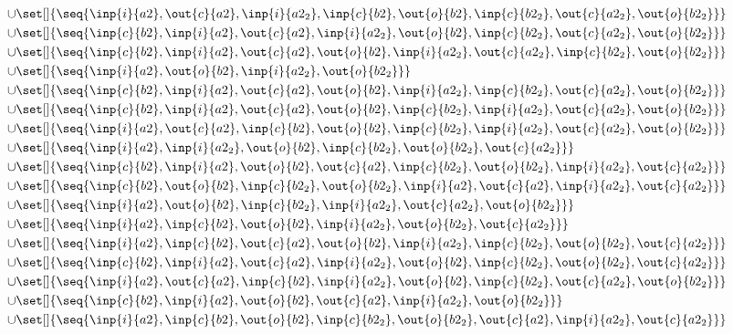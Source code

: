 \begin{align*}
\cup&\set[]{\seq{\inp{i}{a2},\out{c}{a2},\inp{i}{a2_2},\inp{c}{b2},\out{o}{b2},\inp{c}{b2_2},\out{c}{a2_2},\out{o}{b2_2}}}\\
\cup&\set[]{\seq{\inp{c}{b2},\inp{i}{a2},\out{c}{a2},\inp{i}{a2_2},\out{o}{b2},\inp{c}{b2_2},\out{c}{a2_2},\out{o}{b2_2}}}\\
\cup&\set[]{\seq{\inp{c}{b2},\inp{i}{a2},\out{c}{a2},\out{o}{b2},\inp{i}{a2_2},\out{c}{a2_2},\inp{c}{b2_2},\out{o}{b2_2}}}\\
\cup&\set[]{\seq{\inp{i}{a2},\out{o}{b2},\inp{i}{a2_2},\out{o}{b2_2}}}\\
\cup&\set[]{\seq{\inp{c}{b2},\inp{i}{a2},\out{c}{a2},\out{o}{b2},\inp{i}{a2_2},\inp{c}{b2_2},\out{c}{a2_2},\out{o}{b2_2}}}\\
\cup&\set[]{\seq{\inp{c}{b2},\inp{i}{a2},\out{c}{a2},\out{o}{b2},\inp{c}{b2_2},\inp{i}{a2_2},\out{c}{a2_2},\out{o}{b2_2}}}\\
\cup&\set[]{\seq{\inp{i}{a2},\out{c}{a2},\inp{c}{b2},\out{o}{b2},\inp{c}{b2_2},\inp{i}{a2_2},\out{c}{a2_2},\out{o}{b2_2}}}\\
\cup&\set[]{\seq{\inp{i}{a2},\inp{i}{a2_2},\out{o}{b2},\inp{c}{b2_2},\out{o}{b2_2},\out{c}{a2_2}}}\\
\cup&\set[]{\seq{\inp{c}{b2},\inp{i}{a2},\out{o}{b2},\out{c}{a2},\inp{c}{b2_2},\out{o}{b2_2},\inp{i}{a2_2},\out{c}{a2_2}}}\\
\cup&\set[]{\seq{\inp{c}{b2},\out{o}{b2},\inp{c}{b2_2},\out{o}{b2_2},\inp{i}{a2},\out{c}{a2},\inp{i}{a2_2},\out{c}{a2_2}}}\\
\cup&\set[]{\seq{\inp{i}{a2},\out{o}{b2},\inp{c}{b2_2},\inp{i}{a2_2},\out{c}{a2_2},\out{o}{b2_2}}}\\
\cup&\set[]{\seq{\inp{i}{a2},\inp{c}{b2},\out{o}{b2},\inp{i}{a2_2},\out{o}{b2_2},\out{c}{a2_2}}}\\
\cup&\set[]{\seq{\inp{i}{a2},\inp{c}{b2},\out{c}{a2},\out{o}{b2},\inp{i}{a2_2},\inp{c}{b2_2},\out{o}{b2_2},\out{c}{a2_2}}}\\
\cup&\set[]{\seq{\inp{c}{b2},\inp{i}{a2},\out{c}{a2},\inp{i}{a2_2},\out{o}{b2},\inp{c}{b2_2},\out{o}{b2_2},\out{c}{a2_2}}}\\
\cup&\set[]{\seq{\inp{i}{a2},\out{c}{a2},\inp{c}{b2},\inp{i}{a2_2},\out{o}{b2},\inp{c}{b2_2},\out{c}{a2_2},\out{o}{b2_2}}}\\
\cup&\set[]{\seq{\inp{c}{b2},\inp{i}{a2},\out{o}{b2},\out{c}{a2},\inp{i}{a2_2},\out{o}{b2_2}}}\\
\cup&\set[]{\seq{\inp{i}{a2},\inp{c}{b2},\out{o}{b2},\inp{c}{b2_2},\out{o}{b2_2},\out{c}{a2},\inp{i}{a2_2},\out{c}{a2_2}}}\\

\end{align*}
